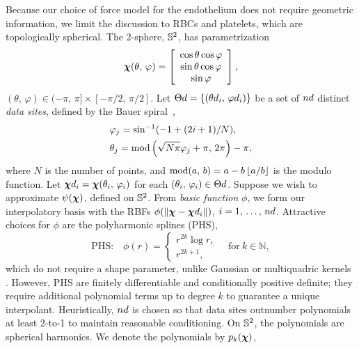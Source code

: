 Because our choice of force model for the endothelium does not require geometric
information, we limit the discussion to RBCs and platelets, which are topologically
spherical. The 2-sphere, $\mathbb{S}^2$, has parametrization
\begin{equation*}
    \boldsymbol{\chi}(\theta,\,\varphi) =
    \left[\begin{array}{c}
        \cos\theta\cos\varphi \\
        \sin\theta\cos\varphi \\
        \sin\varphi
    \end{array}\right],
\end{equation*}
$(\theta,\,\varphi)\in(-\pi,\,\pi]\times[-\pi/2,\,\pi/2]$.
Let $\data\sites = \{(\data\theta_i,\,\data\varphi_i)\}$ be a set of $\data\cardinality$
distinct \emph{data sites}, defined by the Bauer spiral~\cite{Bauer:2000km},
\begin{equation}\label{eq:bauer-spiral}
    \begin{aligned}
        &\varphi_j = \sin^{-1}(-1 + (2i + 1) / N), \\
        &\theta_j = \operatorname{mod}\left(\sqrt{N\pi}\varphi_j + \pi,\,2\pi\right) - \pi,
    \end{aligned}
\end{equation}
where $N$ is the number of points, and $\operatorname{mod}(a,\,b) = a - b\left\lfloor{a/b}\right\rfloor$ is the modulo
function. Let $\data\Xp_i = \Xp(\theta_i,\,\varphi_i)$ for each
$(\theta_i,\,\varphi_i) \in \data\sites$. Suppose we wish to approximate $\psi(\boldsymbol{\chi})$,
defined on $\mathbb{S}^2$. From \emph{basic function} $\phi$, we form our interpolatory basis
with the RBFs $\phi(\|\Xp-\data\Xp_i\|)$, $i=1,\,\ldots,\,\data\cardinality$. Attractive
choices for $\phi$ are the polyharmonic splines (PHS),
\begin{equation*}
    \text{PHS:}\quad\phi(r) = \begin{cases}
        r^{2k} \log r, \\
        r^{2k+1},
    \end{cases}
    \quad\text{for}\ k\in\mathbb{N},
\end{equation*}
which do not require a shape parameter, unlike Gaussian or multiquadric kernels~%
\cite{Fasshauer:2007ui}. However, PHS are finitely differentiable and conditionally
positive definite; they require additional polynomial terms up to degree $k$ to guarantee
a unique interpolant. Heuristically, $\data\cardinality$ is chosen so that data sites
outnumber polynomials at least 2-to-1 to maintain reasonable conditioning. On $\mathbb{S}^2$,
the polynomials are spherical harmonics. We denote the polynomials by $p_k(\boldsymbol{\chi})$,
